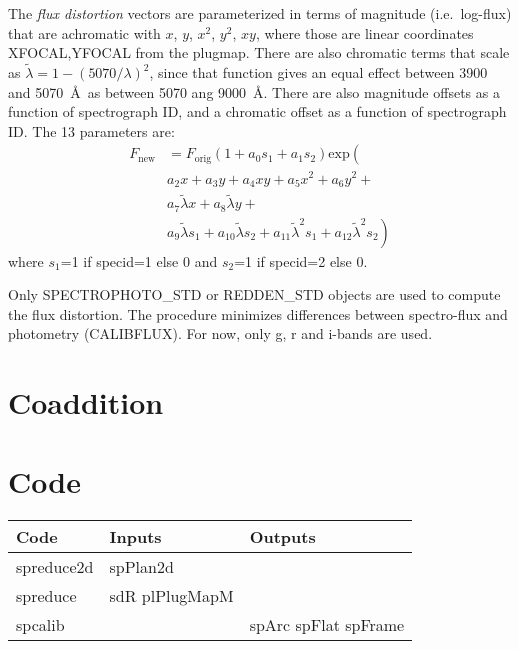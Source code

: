 \documentclass[12pt]{article}
\begin{document}
The {\it flux distortion} vectors are parameterized in terms of magnitude
(i.e.~log-flux) that are achromatic with $x$, $y$, $x^2$, $y^2$, $xy$,
where those are linear coordinates XFOCAL,YFOCAL from the plugmap.
There are also chromatic terms that scale as
$\tilde \lambda = 1-(5070/\lambda)^2$,
since that function gives an equal effect between 3900 and 5070~\AA\
as between 5070 ang 9000~\AA.
There are also magnitude offsets as a function of spectrograph ID,
and a chromatic offset as a function of spectrograph ID.  The 13 parameters are:
\begin{equation}
\begin{split}
    F_\mathrm{new} &= F_\mathrm{orig}
        \left(1 + a_0 s_1 + a_1 s_2 \right) \mathrm{exp} \left( \right. \\
&            a_2 x + a_3 y + a_4 x y + a_5 x^2 + a_6 y^2 + \\
&            a_7 \tilde \lambda x + a_8 \tilde \lambda y + \\
&             a_9 \tilde \lambda s_1 + a_{10} \tilde \lambda s_2 +
             a_{11} \tilde \lambda^2 s_1 + a_{12} \tilde \lambda^2 s_2
        \left. \right)
\end{split}
\end{equation}
where $s_1$=1 if specid=1 else 0 and $s_2$=1 if specid=2 else 0.

Only \textsc{SPECTROPHOTO\_STD} or \textsc{REDDEN\_STD} objects are used to compute the flux distortion. The procedure minimizes differences between spectro-flux and photometry (CALIBFLUX). For now, only g, r and i-bands are used.

\section{Coaddition}

\section{Code}

\begin{tabular}{lp{30mm}p{30mm}}
Code & Inputs & Outputs \\
\hline
spreduce2d  & spPlan2d  & \\
\hline
  spreduce    & sdR \newline plPlugMapM & \\
\hline
    spcalib     &       & spArc \newline spFlat \newline spFrame \\
\end{tabular}
\end{document}
